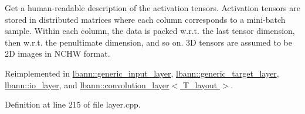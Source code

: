 Get a human-\/readable description of the activation tensors. Activation tensors are stored in distributed matrices where each column corresponds to a mini-\/batch sample. Within each column, the data is packed w.\+r.\+t. the last tensor dimension, then w.\+r.\+t. the penultimate dimension, and so on. 3D tensors are assumed to be 2D images in N\+C\+HW format. 

Reimplemented in \hyperlink{classlbann_1_1generic__input__layer_a36d9962105ca89889e3f38f1c1801560}{lbann\+::generic\+\_\+input\+\_\+layer}, \hyperlink{classlbann_1_1generic__target__layer_ad6ea9a43254664c75aa06e8e5c1d7e8c}{lbann\+::generic\+\_\+target\+\_\+layer}, \hyperlink{classlbann_1_1io__layer_a955ab7100591d07d0758e8f95c6e50be}{lbann\+::io\+\_\+layer}, and \hyperlink{classlbann_1_1convolution__layer_a5af5bb8b7fb68ed4e5085be676788eed}{lbann\+::convolution\+\_\+layer$<$ T\+\_\+layout $>$}.



Definition at line 215 of file layer.\+cpp.


